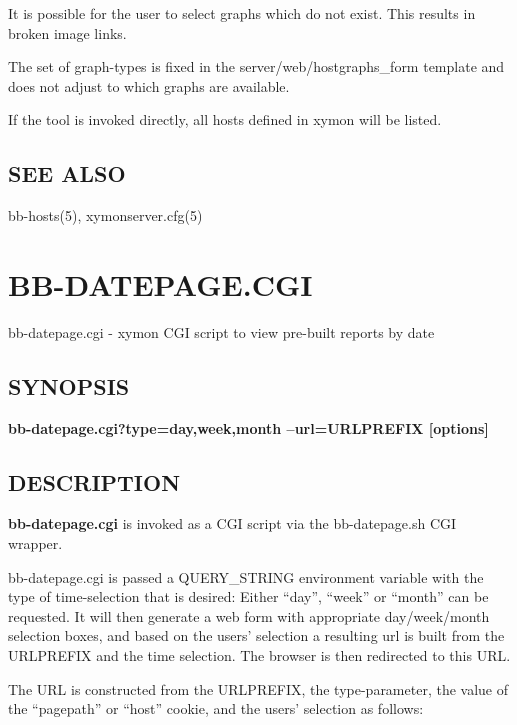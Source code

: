   It is possible for the user to select graphs which do not exist. This results in broken image links. 


  The set of graph-types is fixed in the server/web/hostgraphs\_form template and does not adjust to which graphs are available. 


  If the tool is invoked directly, all hosts defined in xymon will be listed. 


 
\subsection{SEE ALSO}
bb-hosts(5), xymonserver.cfg(5) 

 

%
%

\newpage
\section{BB-DATEPAGE.CGI}

 bb-datepage.cgi - xymon CGI script to view pre-built reports by date \

\subsection{SYNOPSIS}

\textbf{bb-datepage.cgi?type={day,week,month} --url=URLPREFIX [options]}


 
\subsection{DESCRIPTION}
\textbf{bb-datepage.cgi}
 is invoked as a CGI script via the bb-datepage.sh CGI wrapper. 

  bb-datepage.cgi is passed a QUERY\_STRING environment variable with
  the type of time-selection that is desired: Either ``day'', ``week''
  or ``month'' can be requested. It will then generate a web form with
  appropriate day/week/month selection boxes, and based on the users'
  selection a resulting url is built from the URLPREFIX and the time
  selection. The browser is then redirected to this URL. 



  The URL is constructed from the URLPREFIX, the type-parameter, the
  value of the ``pagepath'' or ``host'' cookie, and the users'
  selection as follows: 



